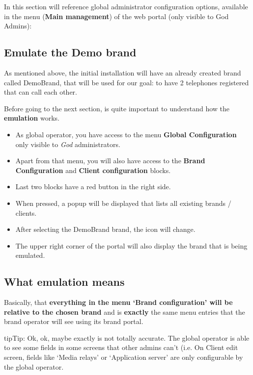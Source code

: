 \documentclass[letterpaper,10pt,english]{sphinxmanual}
\begin{document}
In this section will reference global administrator configuration options,
available in the menu (\textbf{Main management}) of the web portal (only visible to
God Admins):


\subsection{Emulate the Demo brand}
\label{getting_started/internal_calls/god_portal:emulate-the-demo-brand}
As mentioned above, the initial installation will have an already created brand
called DemoBrand, that will be used for our goal: to have 2 telephones registered
that can call each other.

Before going to the next section, is quite important to understand how the
\textbf{emulation} works.
\begin{itemize}
\item {} 
As global operator, you have access to the menu \textbf{Global Configuration} only
visible to \emph{God} administrators.

\item {} 
Apart from that menu, you will also have access to the \textbf{Brand Configuration}
and \textbf{Client configuration} blocks.

\item {} 
Last two blocks have a red button in the right side.

\item {} 
When pressed, a popup will be displayed that lists all existing brands / clients.

\item {} 
After selecting the DemoBrand brand, the icon will change.

\item {} 
The upper right corner of the portal will also display the brand that is being
emulated.

\end{itemize}


\subsection{What emulation means}
\label{getting_started/internal_calls/god_portal:what-emulation-means}
Basically, that \textbf{everything in the menu `Brand configuration' will be relative
to the chosen brand} and is \textbf{exactly} the same menu entries that the brand
operator will see using its brand portal.

\begin{notice}{tip}{Tip:}
Ok, ok, maybe exactly is not totally accurate. The global operator is
able to see some fields in some screens that other admins can't (i.e. On
Client edit screen, fields like `Media relays' or `Application server' are
only configurable by the global operator.
\end{notice}
\end{document}
